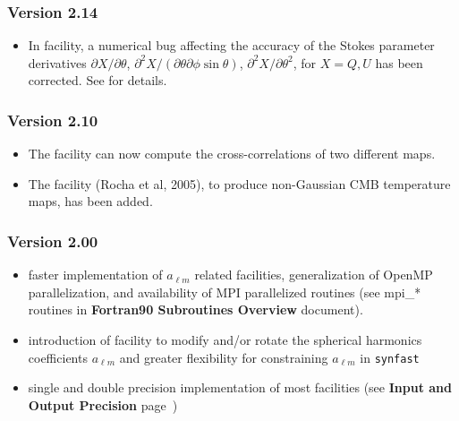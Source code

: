 \documentclass[12pt,twoside]{article}
\newcommand{\compresslist}{%
\setlength{\itemsep}{0ex}}{}
\begin{document}
{%
\subsubsection{Version 2.14}
\begin{itemize}\compresslist
\item In  facility, a numerical bug affecting the accuracy of the Stokes parameter derivatives 
$\partial X/\partial\theta$, 
$\partial^2 X/(\partial\theta\partial\phi\sin\theta)$, 
$\partial^2 X/\partial \theta^2$, 
for $X=Q,U$ has been corrected. See  for details.
\end{itemize}

\subsubsection{Version 2.10}
\begin{itemize}\compresslist
\item The  facility can now compute the cross-correlations of two different
maps. 
\item The  facility (Rocha et al, 2005), to produce non-Gaussian CMB temperature maps,
has been added.
\end{itemize}

\subsubsection{Version 2.00}
\begin{itemize}\compresslist
\item faster implementation of $a_{\ell m}$ related facilities, generalization of
  OpenMP parallelization, and availability of MPI parallelized routines (see
  mpi\_* routines in {\bf Fortran90 Subroutines Overview} document).
\item introduction of  facility to modify and/or rotate the spherical
  harmonics coefficients $a_{\ell m}$ and greater flexibility for constraining
  $a_{\ell m}$ in {\tt synfast}
\item single and double precision implementation of most facilities (see {\bf {Input and Output Precision}}
  page~\pageref{page:ioprec})
\end{itemize}
}%
\end{document}
